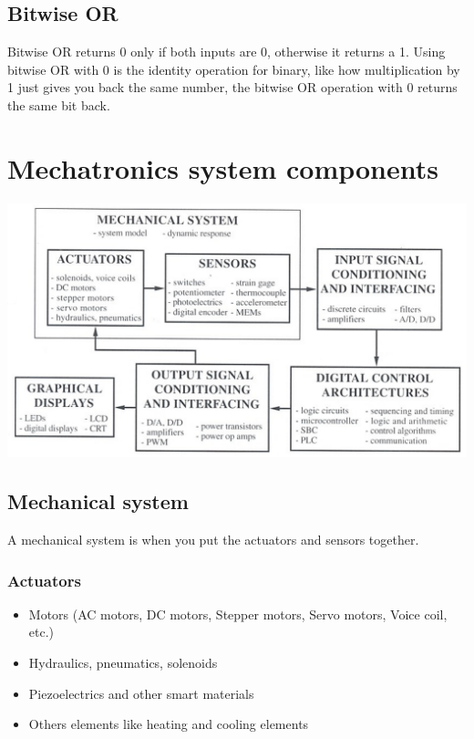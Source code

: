 \documentclass[11pt]{article}
\begin{document}
\subsection{Bitwise OR}
\label{sec:org1895efc}
Bitwise OR returns 0 only if both inputs are 0, otherwise it returns a 1. Using bitwise OR with 0 is the identity operation for binary, like how multiplication by 1 just gives you back the same number, the bitwise OR operation with 0 returns the same bit back.

 \newpage
\section{Mechatronics system components}
\label{sec:orgfcdc3e8}
\begin{center}
\includegraphics[width=.9\linewidth]{./images/mechatronics-system-components-overview.png}
\end{center}
\subsection{Mechanical system}
\label{sec:org59d2deb}
A mechanical system is when you put the actuators and sensors together.
\subsubsection{Actuators}
\label{sec:org09a5406}
\begin{itemize}
\item Motors (AC motors, DC motors, Stepper motors, Servo motors, Voice coil, etc.)
\item Hydraulics, pneumatics, solenoids
\item Piezoelectrics and other smart materials
\item Others elements like heating and cooling elements
\end{itemize}
\end{document}
